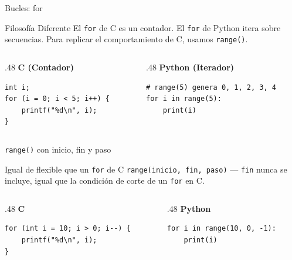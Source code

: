\documentclass{beamer}
\begin{document}
\begin{frame}[fragile]{Bucles: for}
  \begin{block}{Filosofía Diferente}
    El \texttt{for} de C es un contador. El \texttt{for} de Python itera sobre secuencias. Para replicar el comportamiento de C, usamos \texttt{range()}.
  \end{block}
  \begin{columns}[T]
    \begin{column}{.48\textwidth}
      \centering\textbf{C (Contador)}
      \begin{verbatim}
int i;
for (i = 0; i < 5; i++) {
    printf("%d\n", i);
}
      \end{verbatim}
    \end{column}
    \begin{column}{.48\textwidth}
      \centering\textbf{Python (Iterador)}
      \begin{verbatim}
# range(5) genera 0, 1, 2, 3, 4
for i in range(5):
    print(i)
      \end{verbatim}
    \end{column}
  \end{columns}
\end{frame}

\begin{frame}[fragile]{\texttt{range()} con inicio, fin y paso}
  \begin{block}{Igual de flexible que un \texttt{for} de C}
    \texttt{range(inicio, fin, paso)} — \texttt{fin} nunca se incluye, igual que la condición de corte de un \texttt{for} en C.
  \end{block}
  \begin{columns}[T]
    \begin{column}{.48\textwidth}
      \centering\textbf{C}
      \begin{verbatim}
for (int i = 10; i > 0; i--) {
    printf("%d\n", i);
}
      \end{verbatim}
    \end{column}
    \begin{column}{.48\textwidth}
      \centering\textbf{Python}
      \begin{verbatim}
for i in range(10, 0, -1):
    print(i)
      \end{verbatim}
    \end{column}
  \end{columns}
\end{frame}
\end{document}
